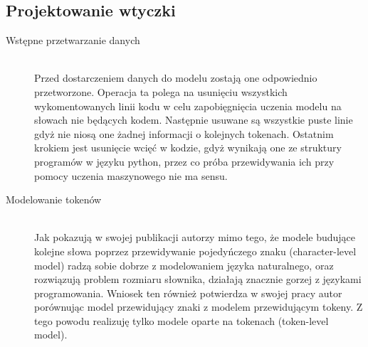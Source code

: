 \subsection{Projektowanie wtyczki}
\begin{description}
\item[Wstępne przetwarzanie danych]
\hfill \\
Przed dostarczeniem danych do modelu zostają one odpowiednio przetworzone. Operacja ta polega na usunięciu wszystkich wykomentowanych linii kodu 
w celu zapobięgnięcia uczenia modelu na słowach nie będących kodem. Następnie usuwane są wszystkie puste linie gdyż nie niosą one żadnej informacji o 
kolejnych tokenach. Ostatnim krokiem jest usunięcie wcięć w kodzie, gdyż wynikają one ze struktury programów w języku python, przez co próba przewidywania  
ich przy pomocy uczenia maszynowego nie ma sensu. \\

\item[Modelowanie tokenów]
\hfill \\
Jak pokazują w swojej publikacji autorzy \cite{character-level} mimo tego, że modele budujące kolejne słowa poprzez 
przewidywanie pojedyńczego znaku (character-level model) radzą sobie dobrze z modelowaniem języka naturalnego, oraz rozwiązują problem rozmiaru słownika, 
działają znacznie gorzej z językami programowania. Wniosek ten również potwierdza w swojej pracy autor \cite{erik} porównując model przewidujący 
znaki z modelem przewidującym tokeny. Z tego powodu realizuję tylko modele oparte na tokenach (token-level model). 


\end{description}

